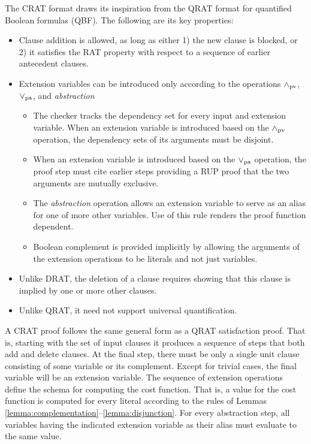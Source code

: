 \documentclass{llncs}
\newcommand{\pand}{\mathbin{\land_{\rm pv}}}
\newcommand{\por}{\mathbin{\lor_{\rm pa}}}
\begin{document}
The CRAT format draws its inspiration from the QRAT format for
quantified Boolean formulas (QBF).  The following are its key properties:
\begin{itemize}
\item Clause addition is allowed, as long as either 1) the new clause is
  blocked, or 2) it satisfies the RAT property with respect to a sequence
  of earlier antecedent clauses.
\item  Extension variables can be introduced only according to the operations $\pand$, $\por$, and {\em abstraction}
\begin{itemize}
\item The checker tracks the dependency set for every input and
  extension variable.  When an extension variable is introduced based
  on the $\pand$ operation, the dependency sets of its arguments must
  be disjoint.
\item When an extension variable is introduced based on the $\por$
  operation, the proof step must cite earlier steps providing a RUP proof
  that the two arguments are mutually exclusive.
\item The {\em abstraction} operation allows an extension
  variable to serve as an alias for one of more other 
  variables.  Use of this rule renders the proof function dependent.
\item Boolean complement is provided implicitly by allowing the
  arguments of the extension operations to be literals and not just
  variables.
\end{itemize}
\item Unlike DRAT, the deletion of a clause requires showing that this clause is implied by one or more other clauses.
\item Unlike QRAT, it need not support universal quantification.
\end{itemize}

A CRAT proof follows the same general form as a QRAT satisfaction
proof.  That is, starting with the set of input clauses it produces a
sequence of steps that both add and delete clauses.  At the final
step, there must be only a single unit clause consisting of some
variable or its complement.  Except for trivial cases, the final
variable will be an extension variable.  The sequence of extension
operations define the schema for computing the cost function.  That
is, a value for the cost function is computed for every literal
according to the rules of Lemmas
\ref{lemma:complementation}--\ref{lemma:disjunction}.  For every
abstraction step, all variables having the indicated
extension variable as their alias must evaluate to the same value.


\end{document}
